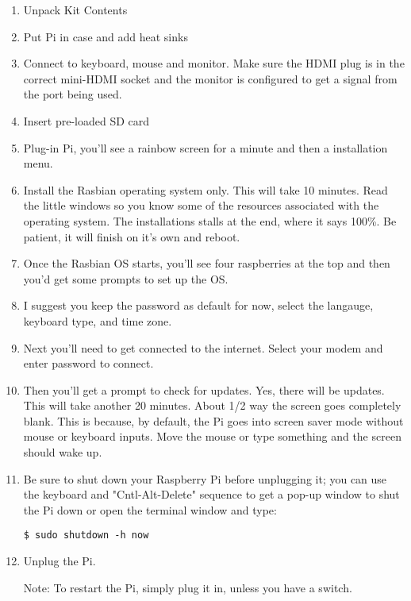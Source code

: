\documentclass{article}\usepackage[]{graphicx}\usepackage[]{color}
\begin{document}
\begin{enumerate}

\item Unpack Kit Contents
\item Put Pi in case and add heat sinks
\item Connect to keyboard, mouse and monitor. Make sure the HDMI plug is in the correct mini-HDMI socket and the monitor is configured to get a signal from the port being used. 
\item Insert pre-loaded SD card
\item Plug-in Pi, you'll see a rainbow screen for a minute and then a installation menu. 
\item Install the Rasbian operating system only. This will take 10 minutes. Read the little windows so you know some of the resources associated with the operating system. The installations stalls at the end, where it says 100\%. Be patient, it will finish on it's own and reboot.

\item Once the Rasbian OS starts, you'll see four raspberries at the top and then you'd get some prompts to set up the OS. 

\item I suggest you keep the password as default for now, select the langauge, keyboard type, and time zone. 

\item Next you'll need to get connected to the internet. Select your modem and enter password to connect.

\item Then you'll get a prompt to check for updates. Yes, there will be updates. This will take another 20 minutes. About 1/2 way the screen goes completely blank. This is because, by default, the Pi goes into screen saver mode without mouse or keyboard inputs. Move the mouse or type something and the screen should wake up. 

\item Be sure to shut down your Raspberry Pi before unplugging it; you can use the keyboard and "Cntl-Alt-Delete" sequence to get a pop-up window to shut the Pi down or open the terminal window and type:

\begin{lstlisting}
$ sudo shutdown -h now
\end{lstlisting}

\item Unplug the Pi.

Note: To restart the Pi, simply plug it in, unless you have a switch. 

\end{enumerate}
\end{document}

